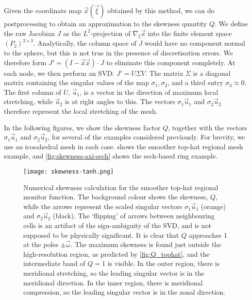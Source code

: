 \documentclass[11pt, a4paper]{scrartcl}  %
\theoremstyle{plain}
\theoremstyle{definition}
\numberwithin{equation}{section}
\begin{document}
Given the coordinate map $\vec{x}(\vec{\xi})$ obtained by this method,
we can do postprocessing to obtain an approximation to the skewness
quantity $Q$. We define the raw Jacobian $J$ as the $L^2$-projection of
$\nabla_\xi \vec{x}$ into the finite element space
$(P_2)^{3 \times 3}$. Analytically, the column space of $J$ would have
no component normal to the sphere, but this is not true in the presence
of discretisation errors. We therefore form
$J' = (I - \vec{x}\vec{x})\cdot J$ to eliminate this component
completely. At each node, we then perform an SVD: $J' = U\Sigma V$.
The matrix $\Sigma$ is a diagonal matrix containing the singular values
of the map $\sigma_1, \sigma_2$, and a third entry $\sigma_3 \approx 0$.
The first column of $U$, $\vec{u}_1$, is a vector in the direction of
maximum local stretching, while $\vec{u}_2$ is at right angles to this.
The vectors $\sigma_1 \vec{u}_1$ and $\sigma_2 \vec{u}_2$ therefore
represent the local stretching of the mesh.

In the following figures, we show the skewness factor $Q$, together with
the vectors $\sigma_1 \vec{u}_1$ and $\sigma_2 \vec{u}_2$, for several
of the examples considered previously. For brevity, we use an
icosahedral mesh in each case.  shows the
smoother top-hat regional mesh example, and \cref{fig:skewness-axi-sech}
shows the sech-based ring example.

\begin{figure}[!tb]
  \centering
  \texttt{[image: skewness-tanh.png]}
  \caption{Numerical skewness calculation for the smoother top-hat regional
monitor function. The background colour shows the skewness, $Q$, while
the arrows represent the scaled singular vectors $\sigma_1 \vec{u}_1$
(orange) and $\sigma_2 \vec{u}_2$ (black). The `flipping' of arrows
between neighbouring cells is an artifact of the sign-ambiguity of the
SVD, and is not supposed to be physically significant. It is clear that
$Q$ approaches 1 at the poles $\pm \vec{\omega}$. The maximum skewness
is found just outside the high-resolution region, as predicted by
\cref{fig:Q_tophat}, and the intermediate band of $Q = 1$ is visible. In
the outer region, there is meridional stretching, so the leading
singular vector is in the meridional direction. In the inner region,
there is meridional compression, so the leading singular vector is in
the zonal direction.}
\label{fig:skewness-axi-tanh}
\end{figure}
\end{document}
